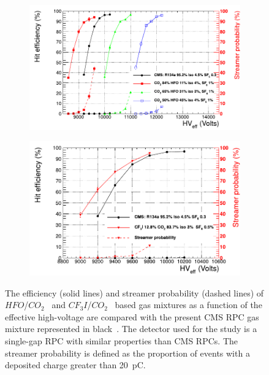 	\begin{figure}
		\begin{subfigure}{\linewidth}
			\centering
			\includegraphics[width=\linewidth]{fig/chapt4/HFO-mixture.pdf}
			\caption{\label{fig:RPC-eco:A}}
		\end{subfigure}
		\begin{subfigure}{\linewidth}
			\centering
			\includegraphics[width=\linewidth]{fig/chapt4/CF3I-mixture.pdf}
			\caption{\label{fig:RPC-eco:B}}
		\end{subfigure}
		\caption{\label{fig:RPC-eco} The efficiency (solid lines) and streamer probability (dashed lines) of $HFO$/$CO_2$~ and $CF_3I$/$CO_2$~ based gas mixtures as a function of the effective high-voltage are compared with the present CMS RPC gas mixture represented in black~\cite{PICCOLO2016,PHASEIITP}. The detector used for the study is a single-gap RPC with similar properties than CMS RPCs. The streamer probability is defined as the proportion of events with a deposited charge greater than \SI{20}{pC}.}
	\end{figure}
	
